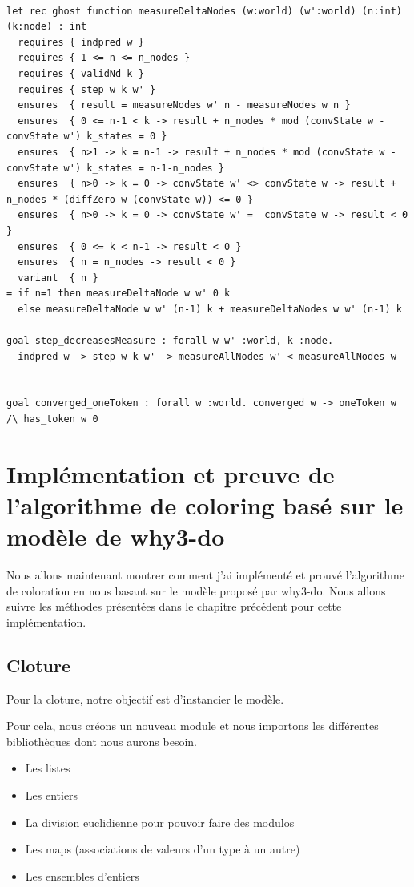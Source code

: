 \documentclass[11pt]{article}
\begin{document}
\lstset{language=why3,label= ,caption= ,captionpos=b,numbers=none}
\begin{lstlisting}

let rec ghost function measureDeltaNodes (w:world) (w':world) (n:int) (k:node) : int
  requires { indpred w }
  requires { 1 <= n <= n_nodes }
  requires { validNd k }
  requires { step w k w' }
  ensures  { result = measureNodes w' n - measureNodes w n }
  ensures  { 0 <= n-1 < k -> result + n_nodes * mod (convState w - convState w') k_states = 0 }
  ensures  { n>1 -> k = n-1 -> result + n_nodes * mod (convState w - convState w') k_states = n-1-n_nodes }
  ensures  { n>0 -> k = 0 -> convState w' <> convState w -> result + n_nodes * (diffZero w (convState w)) <= 0 }
  ensures  { n>0 -> k = 0 -> convState w' =  convState w -> result < 0 }
  ensures  { 0 <= k < n-1 -> result < 0 }
  ensures  { n = n_nodes -> result < 0 }
  variant  { n }
= if n=1 then measureDeltaNode w w' 0 k
  else measureDeltaNode w w' (n-1) k + measureDeltaNodes w w' (n-1) k

goal step_decreasesMeasure : forall w w' :world, k :node.
  indpred w -> step w k w' -> measureAllNodes w' < measureAllNodes w


goal converged_oneToken : forall w :world. converged w -> oneToken w /\ has_token w 0

\end{lstlisting}

\section{Implémentation et preuve de l’algorithme de coloring basé sur le modèle de why3-do}
\label{sec:orgd994304}

Nous allons maintenant montrer comment j'ai implémenté et prouvé l'algorithme de coloration en nous basant sur le modèle proposé par why3-do.
Nous allons suivre les méthodes présentées dans le chapitre précédent pour cette implémentation.

\subsection{Cloture}
\label{sec:org7e1a303}

Pour la cloture, notre objectif est d'instancier le modèle. 

Pour cela, nous créons un nouveau module et nous importons les différentes bibliothèques dont nous aurons besoin. 
\begin{itemize}
\item Les listes
\item Les entiers
\item La division euclidienne pour pouvoir faire des modulos
\item Les maps (associations de valeurs d'un type à un autre)
\item Les ensembles d'entiers
\end{itemize}
\end{document}
